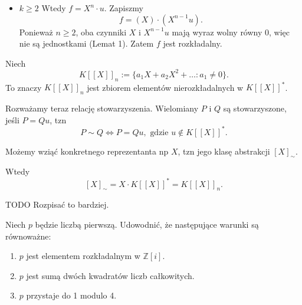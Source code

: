 \begin{solution}
\begin{itemize}
	Wtedy
	\[
	X = X^{m_1 + m_2} \cdot (u_1 u_2).
	\]
	Porównując rzędy obu stron, otrzymujemy $m_1 + m_2 = 1$. Ponieważ $m_1, m_2 \in \mathbb{N}$, mamy tylko dwie możliwości:
	\begin{itemize}
    	\item $m_1 = 1$, $m_2 = 0$: wtedy $g = X u_1$ nie jest jednostką, ale $h = u_2$ jest jednostką.
    	\item $m_1 = 0$, $m_2 = 1$: wtedy $g = u_1$ jest jednostką, a $h = X u_2$ nie jest jednostką.
	\end{itemize}
	Zatem w każdym możliwym rozkładzie $X = g \cdot h$ jeden z czynników jest jednostką, co oznacza, że $X$ jest nierozkładalny.
	\item $k\ge 2$ Wtedy $f = X^n \cdot u$. Zapiszmy
	\[
	f = (X) \cdot (X^{n-1} u).
	\]
	Ponieważ $n \geq 2$, oba czynniki $X$ i $X^{n-1} u$ mają wyraz wolny równy $0$, więc nie są jednostkami (Lemat 1). Zatem $f$ jest rozkładalny.
	\end{itemize}

	\begin{remark}
		Niech 
		 \[
		K\left[ \left[ X \right]  \right]_{n}  := \{a_1X + a_2X^2 + \ldots : a_1\neq 0\} 
		.\] 
		To znaczy $K\left[ \left[ X \right]  \right]_{n} $ jest zbiorem elementów nierozkładalnych w $K\left[ \left[ X \right]  \right]^{\ast}$.

		Rozważamy teraz relację stowarzyszenia. Wielomiany $P$ i $Q$ są stowarzyszone, jeśli  $P = Qu$, tzn
		\[
		P \sim Q \iff P = Qu, \text{ gdzie } u \not\in K\left[ \left[ X \right]  \right]^{\ast} 
		.\] 

		Możemy wziąć konkretnego reprezentanta np $X$, tzn jego klasę abstrakcji $\left[ X \right]_{\sim}$.

		Wtedy
		 \[
		\left[ X \right]_{\sim} = X\cdot K\left[ \left[ X\right]\right]^{\ast} = K\left[ \left[ X \right]\right]_{n} 
		.\] 

		TODO Rozpisać to bardziej.
	\end{remark} 
\end{solution}
\begin{problem}[8]
	Niech $p$ będzie liczbą pierwszą. Udowodnić, że następujące warunki są równoważne:
	\begin{enumerate}[label=(\alph*)]
		\item $p$ jest elementem rozkładalnym w $\mathbb{Z}\left[ i \right] $.
		\item $p$ jest sumą dwóch kwadratów liczb całkowitych.
		\item $p$ przystaje do 1 modulo 4.
	\end{enumerate}
\end{problem} 
